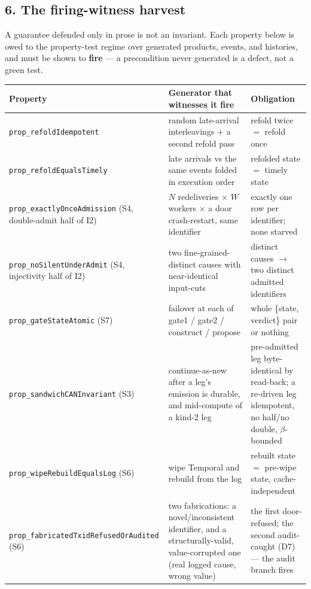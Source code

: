 \documentclass[11pt,a4paper]{article}
\begin{document}
\subsection*{6. The firing-witness harvest}

A guarantee defended only in prose is not an invariant. Each property below is owed to the property-test
regime over generated products, events, and histories, and must be shown to \textbf{fire} --- a
precondition never generated is a defect, not a green test.

{\footnotesize
\renewcommand{\arraystretch}{1.0}
\setlength{\tabcolsep}{3pt}
\begin{longtable}{@{}p{} p{} p{}@{}}
\toprule
\textbf{Property} & \textbf{Generator that witnesses it fire} & \textbf{Obligation} \\
\midrule
\endhead
\texttt{prop\_refoldIdempotent} & random late-arrival interleavings $+$ a second refold pass & refold
twice $=$ refold once \\
\texttt{prop\_refoldEqualsTimely} & late arrivals vs the same events folded in execution order & refolded
state $=$ timely state \\
\texttt{prop\_exactlyOnceAdmission} (S4, double-admit half of I2) & $N$ redeliveries $\times$ $W$ workers
$\times$ a door crash-restart, same identifier & exactly one row per identifier; none starved \\
\texttt{prop\_noSilentUnderAdmit} (S4, injectivity half of I2) & two fine-grained-distinct causes with
near-identical input-cuts & distinct causes $\to$ two distinct admitted identifiers \\
\texttt{prop\_gateStateAtomic} (S7) & failover at each of gate1 / gate2 / construct / propose & whole
\{state, verdict\} pair or nothing \\
\texttt{prop\_sandwichCANInvariant} (S3) & continue-as-new after a leg's emission is durable, and
mid-compute of a kind-2 leg & pre-admitted leg byte-identical by read-back; a re-driven leg idempotent, no
half/no double, $\beta$-bounded \\
\texttt{prop\_wipeRebuildEqualsLog} (S6) & wipe Temporal and rebuild from the log & rebuilt state $=$
pre-wipe state, cache-independent \\
\texttt{prop\_fabricatedTxidRefusedOrAudited} (S6) & two fabrications: a novel/inconsistent identifier, and
a structurally-valid, value-corrupted one (real logged cause, wrong value) & the first door-refused; the
second audit-caught (D7) --- the audit branch fires \\

\end{longtable}}
\end{document}
